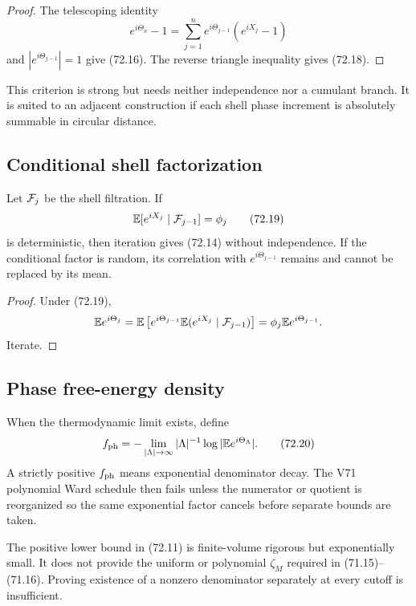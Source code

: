 \documentclass[11pt]{article}
\begin{document}
\begin{proof}
The telescoping identity
\[
 e^{i\Theta_n}-1
 =\sum_{j=1}^ne^{i\Theta_{j-1}}(e^{iX_j}-1)
\]
and \(|e^{i\Theta_{j-1}}|=1\) give (72.16).  The reverse triangle
inequality gives (72.18).
\end{proof}

This criterion is strong but needs neither independence nor a cumulant
branch.  It is suited to an adjacent construction if each shell phase
increment is absolutely summable in circular distance.

\subsection{Conditional shell factorization}

Let \({\cal F}_j\) be the shell filtration.  If
\[
                         {\mathbb E}[e^{iX_j}\mid{\cal F}_{j-1}]
                              =\phi_j                         \tag{72.19}
\]
is deterministic, then iteration gives (72.14) without independence.
If the conditional factor is random, its correlation with
\(e^{i\Theta_{j-1}}\) remains and cannot be replaced by its mean.

\begin{proof}
Under (72.19),
\[
 {\mathbb E}e^{i\Theta_j}
 ={\mathbb E}\left[
 e^{i\Theta_{j-1}}
 {\mathbb E}(e^{iX_j}\mid{\cal F}_{j-1})\right]
 =\phi_j{\mathbb E}e^{i\Theta_{j-1}}.
\]
Iterate.
\end{proof}

\subsection{Phase free-energy density}

When the thermodynamic limit exists, define
\[
                         f_{\rm ph}
 =-\lim_{|\Lambda|\to\infty}
       |\Lambda|^{-1}\log|{\mathbb E}e^{i\Theta_\Lambda}|.    \tag{72.20}
\]
A strictly positive \(f_{\rm ph}\) means exponential denominator
decay.  The V71 polynomial Ward schedule then fails unless the
numerator or quotient is reorganized so the same exponential factor
cancels before separate bounds are taken.

\begin{warning}
\label{warn:v11v72-small}
The positive lower bound in (72.11) is finite-volume rigorous but
exponentially small.  It does not provide the uniform or polynomial
\(\zeta_M\) required in (71.15)--(71.16).  Proving existence of a
nonzero denominator separately at every cutoff is insufficient.
\end{warning}
\end{document}
